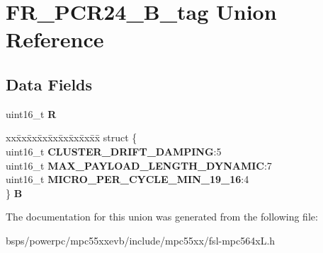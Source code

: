 \hypertarget{unionFR__PCR24__16B__tag}{}\section{F\+R\+\_\+\+P\+C\+R24\+\_\+B\+\_\+tag Union Reference}
\label{unionFR__PCR24__16B__tag}
\subsection*{Data Fields}
\begin{DoxyCompactItemize}
\item 
\mbox{\label{unionFR__PCR24__16B__tag_a12fe94fc5c913f2399ea8e6d251f36b3}} 
uint16\+\_\+t {\bfseries R}
\item 
\mbox{\label{unionFR__PCR24__16B__tag_a832f9c1627b4df9ec0773da38901813f}} 
\begin{tabbing}
xx\=xx\=xx\=xx\=xx\=xx\=xx\=xx\=xx\=\kill
struct \{\\
\>uint16\_t {\bfseries CLUSTER\_DRIFT\_DAMPING}:5\\
\>uint16\_t {\bfseries MAX\_PAYLOAD\_LENGTH\_DYNAMIC}:7\\
\>uint16\_t {\bfseries MICRO\_PER\_CYCLE\_MIN\_19\_16}:4\\
\} {\bfseries B}\\

\end{tabbing}\end{DoxyCompactItemize}


The documentation for this union was generated from the following file\+:\begin{DoxyCompactItemize}
\item 
bsps/powerpc/mpc55xxevb/include/mpc55xx/fsl-\/mpc564x\+L.\+h\end{DoxyCompactItemize}
